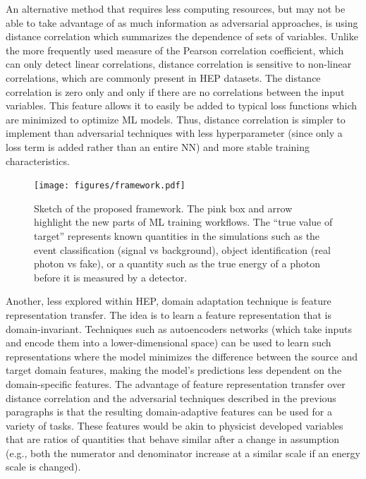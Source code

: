 \documentclass[letter, USenglish, 11pt, subfigure]{article}
\begin{document}
An alternative method that requires less computing resources, but may not be able to take advantage of as much information as adversarial approaches, is using distance correlation which summarizes the dependence of sets of variables. Unlike the more frequently used measure of the Pearson correlation coefficient, which can only detect linear correlations, distance correlation is sensitive to non-linear correlations, which are commonly present in HEP datasets. The distance correlation is zero only and only if there are no correlations between the input variables. This feature allows it to easily be added to typical loss functions which are minimized to optimize ML models. Thus, distance correlation is simpler to implement than adversarial techniques with less hyperparameter (since only a loss term is added rather than an entire NN) and more stable training characteristics. 
\begin{figure}
  \centering
  \texttt{[image: figures/framework.pdf]}
  \caption{\label{fig:framework} Sketch of the proposed framework. The pink box and arrow highlight the new parts of ML training workflows. The ``true value of target'' represents known quantities in the simulations such as the event classification (signal vs background), object identification (real photon vs fake), or a quantity such as the true energy of a photon before it is measured by a detector. }
\end{figure}
Another, less explored within HEP, domain adaptation technique is feature representation transfer. The idea is to learn a feature representation that is domain-invariant. Techniques such as autoencoders networks (which take inputs and encode them into a lower-dimensional space) can be used to learn such representations where the model minimizes the difference between the source and target domain features, making the model's predictions less dependent on the domain-specific features. The advantage of feature representation transfer over distance correlation and the adversarial techniques described in the previous paragraphs is that the resulting domain-adaptive features can be used for a variety of tasks. These features would be akin to physicist developed variables that are ratios of quantities that behave similar after a change in assumption (e.g., both the numerator and denominator increase at a similar scale if an energy scale is changed).
\end{document}
